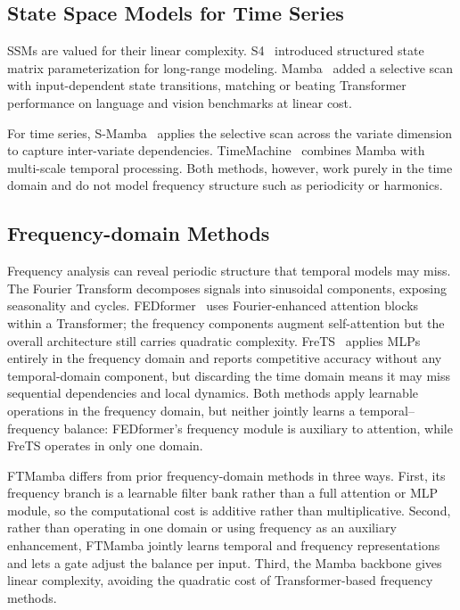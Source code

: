 \documentclass[symmetry,article,submit,pdftex,moreauthors]{Definitions/mdpi}
\begin{document}
\subsection{State Space Models for Time Series}

SSMs are valued for their linear complexity. S4~\cite{ref15} introduced structured state matrix parameterization for long-range modeling. Mamba~\cite{ref10} added a selective scan with input-dependent state transitions, matching or beating Transformer performance on language and vision benchmarks at linear cost.

For time series, S-Mamba~\cite{ref11} applies the selective scan across the variate dimension to capture inter-variate dependencies. TimeMachine~\cite{ref12} combines Mamba with multi-scale temporal processing. Both methods, however, work purely in the time domain and do not model frequency structure such as periodicity or harmonics.

\subsection{Frequency-domain Methods}

Frequency analysis can reveal periodic structure that temporal models may miss. The Fourier Transform decomposes signals into sinusoidal components, exposing seasonality and cycles. FEDformer~\cite{ref7} uses Fourier-enhanced attention blocks within a Transformer; the frequency components augment self-attention but the overall architecture still carries quadratic complexity. FreTS~\cite{ref16} applies MLPs entirely in the frequency domain and reports competitive accuracy without any temporal-domain component, but discarding the time domain means it may miss sequential dependencies and local dynamics. Both methods apply learnable operations in the frequency domain, but neither jointly learns a temporal--frequency balance: FEDformer's frequency module is auxiliary to attention, while FreTS operates in only one domain.

FTMamba differs from prior frequency-domain methods in three ways. First, its frequency branch is a learnable filter bank rather than a full attention or MLP module, so the computational cost is additive rather than multiplicative. Second, rather than operating in one domain or using frequency as an auxiliary enhancement, FTMamba jointly learns temporal and frequency representations and lets a gate adjust the balance per input. Third, the Mamba backbone gives linear complexity, avoiding the quadratic cost of Transformer-based frequency methods.
\end{document}
